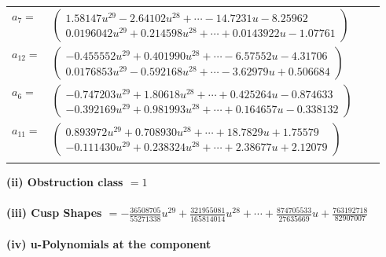 \documentclass[1p]{elsarticle_modified}
\theoremstyle{definition}
\begin{document}
\begin{tabular}{m{7pt} m{180pt} m{7pt} m{180pt} }
\flushright $a_{7}=$&$\begin{pmatrix}1.58147 u^{29}-2.64102 u^{28}+\cdots-14.7231 u-8.25962\\0.0196042 u^{29}+0.214598 u^{28}+\cdots+0.0143922 u-1.07761\end{pmatrix}$ \\
\flushright $a_{12}=$&$\begin{pmatrix}-0.455552 u^{29}+0.401990 u^{28}+\cdots-6.57552 u-4.31706\\0.0176853 u^{29}-0.592168 u^{28}+\cdots-3.62979 u+0.506684\end{pmatrix}$ \\
\flushright $a_{6}=$&$\begin{pmatrix}-0.747203 u^{29}+1.80618 u^{28}+\cdots+0.425264 u-0.874633\\-0.392169 u^{29}+0.981993 u^{28}+\cdots+0.164657 u-0.338132\end{pmatrix}$ \\
\flushright $a_{11}=$&$\begin{pmatrix}0.893972 u^{29}+0.708930 u^{28}+\cdots+18.7829 u+1.75579\\-0.111430 u^{29}+0.238324 u^{28}+\cdots+2.38677 u+2.12079\end{pmatrix}$\\&\end{tabular}
\flushleft \textbf{(ii) Obstruction class $= 1$}\\~\\
\flushleft \textbf{(iii) Cusp Shapes $= -\frac{36508705}{55271338} u^{29}+\frac{321955081}{165814014} u^{28}+\cdots+\frac{874705533}{27635669} u+\frac{763192718}{82907007}$}\\~\\
\newpage\renewcommand{\arraystretch}{1}
\flushleft \textbf{(iv) u-Polynomials at the component}\newline \\
\end{document}
